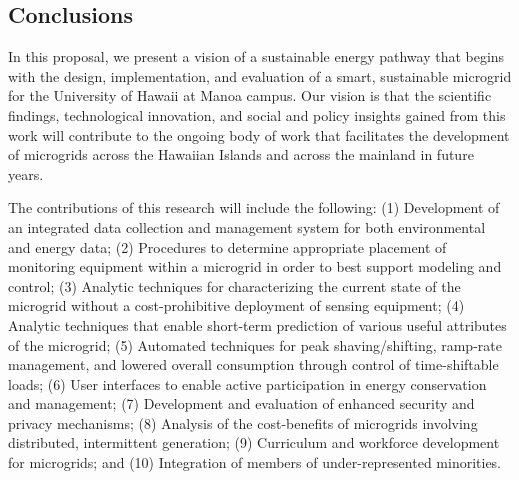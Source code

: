 
\subsection{Conclusions}

In this proposal, we present a vision of a sustainable energy pathway that
begins with the design, implementation, and evaluation of a smart,
sustainable microgrid for the University of Hawaii at Manoa campus.  Our
vision is that the scientific findings, technological innovation, and
social and policy insights gained from this work will contribute to the
ongoing body of work that facilitates the development of microgrids across
the Hawaiian Islands and across the mainland in future years.

The contributions of this research will include the following: (1)
Development of an integrated data collection and management system for both
environmental and energy data; (2) Procedures to determine appropriate
placement of monitoring equipment within a microgrid in order to best
support modeling and control; (3) Analytic techniques for characterizing
the current state of the microgrid without a cost-prohibitive deployment of
sensing equipment; (4) Analytic techniques that enable short-term
prediction of various useful attributes of the microgrid; (5) Automated
techniques for peak shaving/shifting, ramp-rate management, and lowered
overall consumption through control of time-shiftable loads; (6) User
interfaces to enable active participation in energy conservation and
management; (7) Development and evaluation of enhanced security and privacy
mechanisms; (8) Analysis of the cost-benefits of microgrids involving
distributed, intermittent generation; (9) Curriculum and workforce
development for microgrids; and (10) Integration of members of
under-represented minorities.




